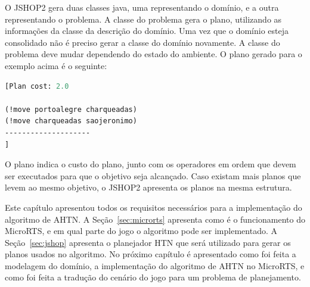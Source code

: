 O JSHOP2 gera duas classes java, uma representando o domínio, e a outra representando o problema.
A classe do problema gera o plano, utilizando as informações da classe da descrição do domínio.
Uma vez que o domínio esteja consolidado não é preciso gerar a classe do domínio novamente. A classe do problema deve mudar dependendo do estado do ambiente.  
O plano gerado para o exemplo acima é o seguinte:

\begin{lstlisting}[language=lisp]
[Plan cost: 2.0

(!move portoalegre charqueadas)
(!move charqueadas saojeronimo)
--------------------
]
\end{lstlisting}

O plano indica o custo do plano, junto com os operadores em ordem que devem ser executados para que o objetivo seja alcançado. 
Caso existam mais planos que levem ao mesmo objetivo, o JSHOP2 apresenta os planos na mesma estrutura.

Este capítulo apresentou todos os requisitos necessários para a implementação do algoritmo de AHTN.
A Seção~\ref{sec:microrts} apresenta como é o funcionamento do MicroRTS, e em qual parte do jogo o algoritmo pode ser implementado.
A Seção~\ref{sec:jshop} apresenta o planejador HTN que será utilizado para gerar os planos usados no algoritmo. 
No próximo capítulo é apresentado como foi feita a modelagem do domínio, a implementação do algoritmo de AHTN no MicroRTS, e como foi feita a tradução do cenário do jogo para um problema de planejamento.

